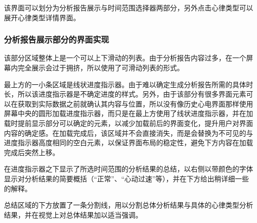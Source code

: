 \begin{figure}[!ht]
    \label{fig:analytics}
\end{figure}

该界面可以划分为分析报告展示与时间范围选择器两部分，另外点击心律类型可以展开心律类型详情界面。

\subsubsection{分析报告展示部分的界面实现}\label{subsubsec:analytics-display-ui}

该部分区域整体上是一个可以上下滑动的列表。由于分析报告内容过多，在一个屏幕内完全展示会过于拥挤，所以使用了可滑动列表的形式。

最上方的一小条区域是线状进度指示器。由于难以确定生成分析报告所需的具体时长，所以该进度指示器是不确定进度的样式。另外，由于该部分有很多界面元素可以在获取到实际数据之前就确认其内容与位置，所以没有像历史心电界面那样使用屏幕中央的圆形加载进度指示器，而只是在最上方使用了线状进度指示器，并在加载时提前显示部分可以确定的元素，以减少加载前后的界面变化，提升用户对界面内容的确定感。在加载完成后，该区域并不会直接消失，而是会替换为不可见的与进度指示器高度相同的空白元素，以保证界面布局的稳定性，避免下方内容在加载完成后突然上移。

在进度指示器之下显示了所选时间范围的分析结果的总结，以右侧以带颜色的字体显示对分析结果的简要概括（“正常”、“心动过速”等），并在下方给出稍详细一些的解释。

总结区域的下方放置了一条分割线，用以分割总体分析结果与具体的心律类型分析结果，并在视觉上对总体结果加以适当强调。


